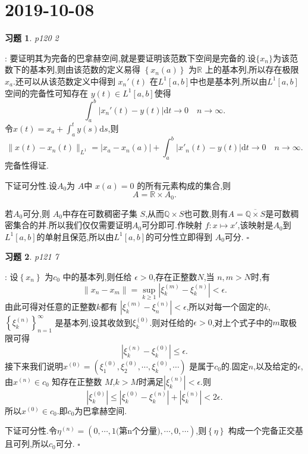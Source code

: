 \documentclass[a4paper]{article}
\newcommand\R{\ensuremath{\mathbb{R}}}
\newcommand\Q{\ensuremath{\mathbb{Q}}}
\newtheorem*{exe}{习题}
\newenvironment{sol}{{\noindent\bfseries 解}:}{\hfill $\square$\par}
\begin{document}
\section{2019-10-08}
\begin{exe}
  p120 2	
\end{exe}
\begin{sol}
  要证明其为完备的巴拿赫空间,就是要证明该范数下空间是完备的.设$\{x_n\}$为该范数下的基本列,则由该范数的定义易得 $\left\{ x_n(a) \right\} $ 为$\R$ 上的基本列,所以存在极限$x_a$.还可以从该范数定义中得到 $x_n'(t)$ 在$L^1[a,b]$中也是基本列,所以由$L^1[a,b]$空间的完备性可知存在 $y(t)\in L^1[a,b]$使得
  \[
    \int_a^b \left| x_n'(t)-y(t) \right| \mathrm{d}t\to 0\quad n\to \infty
  .\] 
  令$x(t)=x_a+\int_a^t y(s)\mathrm{d}s$,则
  \[
    \|x(t)-x_n(t)\|_{L^1}= \left| x_a-x_n(a) \right| +\int_a^b\left| x'_n(t)-y(t) \right|\mathrm{d}t\to 0\quad n\to \infty 
  .\] 
  完备性得证.

  下证可分性.设$A_0$为 $A$中 $x(a)=0$ 的所有元素构成的集合,则
  \[
    A=\R\times A_0  
  .\]

若$A_0$可分,则 $A_0$中存在可数稠密子集 $S$,从而$\Q\times S$也可数,则有$A=\overline{\Q\times S}$是可数稠密集合的并.所以我们仅仅需要证明$A_0$可分即可.作映射 $f:x\mapsto x'$,该映射是$A_0$到 $L^1[a,b]$的单射且保范,所以由$L^1[a,b]$的可分性立即得到 $A_0$可分.
\end{sol}
\begin{exe}
  p121 7
\end{exe}
\begin{sol}
  设$\left\{ x_n \right\} $ 为$c_0$ 中的基本列,则任给 $\epsilon >0$,存在正整数$N$,当 $n,m>N$时,有
   \[
  \|x_n-x_m\|=\sup_{k\ge 1}\left| \xi^{(m)}_k-\xi^{(n)}_k \right|<\epsilon  
  .\] 
  由此可得对任意的正整数$k$都有 $\left| \xi^{(m)}_k-\xi^{(n)}_{n} \right| <\epsilon $,所以对每一个固定的$k$, $\left\{ \xi^{(n)}_k \right\}_{n=1}^{\infty} $ 是基本列,设其收敛到$\xi_k^{(0)}$.则对任给的$\epsilon >0$,对上个式子中的$m$取极限可得
   \[
  \left| \xi_k^{(n)}-\xi_k^{(0)} \right| \le \epsilon 
  .\]
  接下来我们说明$x^{(0)}=\left( \xi^{(0)}_1,\xi^{(0)}_2,\cdots,\xi^{(0)}_k,\cdots \right) $ 是属于$c_0$的.固定$n$,以及给定的$\epsilon $,由$x^{(n)}\in c_0$ 知存在正整数 $M$,$k>M$时满足$\left| \xi_k^{(n)} \right| <\epsilon $.则
  \[
  \left| \xi^{(0)}_k \right| \le \left| \xi^{(0)}_k-\xi^{(n)}_k \right| +\left| \xi^{(n)}_k \right| <2\epsilon 
  .\] 
  所以$x^{(0)}\in c_0$.即$c_0$为巴拿赫空间.
  
  下证可分性.令$\eta^{(n)}=\left( 0,\cdots,1\text{(第n个分量)},\cdots,0,\cdots \right) $,则$\left\{ \eta \right\} $ 构成一个完备正交基且可列,所以$c_0$可分.
\end{sol}
\end{document}
